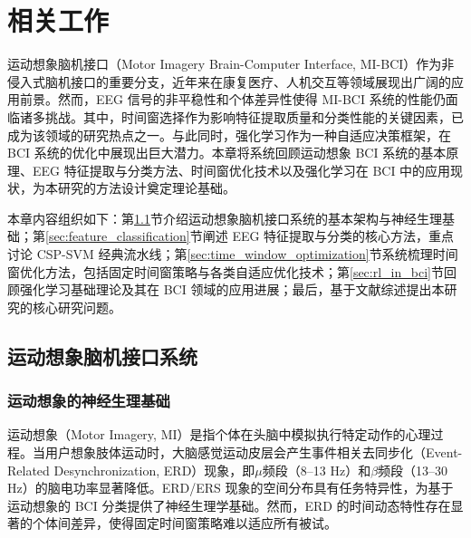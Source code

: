 
\chapter{相关工作}
\label{chap:related_work}

运动想象脑机接口（Motor Imagery Brain-Computer Interface, MI-BCI）作为非侵入式脑机接口的重要分支，近年来在康复医疗、人机交互等领域展现出广阔的应用前景\cite{pfurtscheller1999event}。然而，EEG 信号的非平稳性和个体差异性使得 MI-BCI 系统的性能仍面临诸多挑战。其中，时间窗选择作为影响特征提取质量和分类性能的关键因素，已成为该领域的研究热点之一\cite{lotte2011regularizing, yang2015time}。与此同时，强化学习作为一种自适应决策框架，在 BCI 系统的优化中展现出巨大潜力\cite{zhang2021mars}。本章将系统回顾运动想象 BCI 系统的基本原理、EEG 特征提取与分类方法、时间窗优化技术以及强化学习在 BCI 中的应用现状，为本研究的方法设计奠定理论基础。

本章内容组织如下：第\ref{sec:mi_bci_system}节介绍运动想象脑机接口系统的基本架构与神经生理基础；第\ref{sec:feature_classification}节阐述 EEG 特征提取与分类的核心方法，重点讨论 CSP-SVM 经典流水线；第\ref{sec:time_window_optimization}节系统梳理时间窗优化方法，包括固定时间窗策略与各类自适应优化技术；第\ref{sec:rl_in_bci}节回顾强化学习基础理论及其在 BCI 领域的应用进展；最后，基于文献综述提出本研究的核心研究问题。

\section{运动想象脑机接口系统}
\label{sec:mi_bci_system}

\subsection{运动想象的神经生理基础}
\label{subsec:neuro_basis}

运动想象（Motor Imagery, MI）是指个体在头脑中模拟执行特定动作的心理过程\cite{pfurtscheller1999event}。当用户想象肢体运动时，大脑感觉运动皮层会产生事件相关去同步化（Event-Related Desynchronization, ERD）现象，即$\mu$频段（8--13 Hz）和$\beta$频段（13--30 Hz）的脑电功率显著降低\cite{pfurtscheller1999event}。ERD/ERS 现象的空间分布具有任务特异性，为基于运动想象的 BCI 分类提供了神经生理学基础\cite{mcfarland1997spatial}。然而，ERD 的时间动态特性存在显著的个体间差异，使得固定时间窗策略难以适应所有被试\cite{lotte2011regularizing}。

